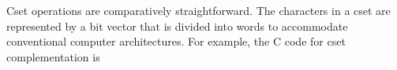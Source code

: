 Cset operations are comparatively straightforward. The characters in a
cset are represented by a bit vector that is divided into words to
accommodate conventional computer architectures. For example, the C
code for cset complementation is


